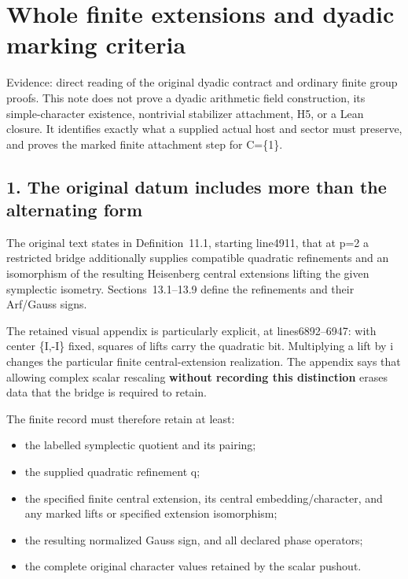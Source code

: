 \clearpage
\section{Whole finite extensions and dyadic marking criteria}\label{app:dyadic_markings}

Evidence: direct reading of the original dyadic contract and ordinary
finite group proofs. This note does not prove a dyadic arithmetic field
construction, its simple-character existence, nontrivial stabilizer
attachment, H5, or a Lean closure. It identifies exactly what a supplied
actual host and sector must preserve, and proves the marked finite
attachment step for C=\{1\}.

\hypertarget{dyadic_markings-the-original-datum-includes-more-than-the-alternating-form}{%
\subsection{1. The original datum includes more than the alternating
form}\label{dyadic_markings-the-original-datum-includes-more-than-the-alternating-form}}

The original text
 states in
Definition~11.1, starting line4911, that at p=2 a restricted bridge
additionally supplies compatible quadratic refinements and an
isomorphism of the resulting Heisenberg central extensions lifting the
given symplectic isometry. Sections~13.1--13.9 define the refinements and
their Arf/Gauss signs.

The retained visual appendix is particularly explicit, at
lines6892--6947: with center \{I,-I\} fixed, squares of lifts carry the
quadratic bit. Multiplying a lift by i changes the particular finite
central-extension realization. The appendix says that allowing complex
scalar rescaling \textbf{without recording this distinction} erases data
that the bridge is required to retain.

The finite record must therefore retain at least:

\begin{itemize}
\tightlist
\item
  the labelled symplectic quotient and its pairing;
\item
  the supplied quadratic refinement q;
\item
  the specified finite central extension, its central
  embedding/character, and any marked lifts or specified extension
  isomorphism;
\item
  the resulting normalized Gauss sign, and all declared phase operators;
\item
  the complete original character values retained by the scalar pushout.
\end{itemize}

